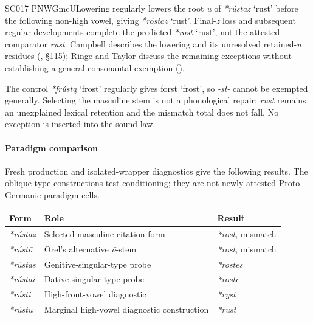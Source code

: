 \documentclass[
  british,
  a4paper,
]{article}
\newcounter{none} %
\providecommand{\Recon}[1]{\emph{*#1}}
\begin{document}
SC017 PNWGmcULowering regularly lowers the root \emph{u} of
\Recon{rústaz} `rust' before the following non-high vowel, giving
\Recon{róstaz} `rust'. Final-\emph{z} loss and subsequent regular
developments complete the predicted \Recon{rost} `rust', not the
attested comparator \emph{rust}. Campbell describes the lowering and its
unresolved retained-\emph{u} residues
(, §115); Ringe and Taylor
discuss the remaining exceptions without establishing a general
consonantal exemption ().

The control \Recon{frústą} `frost' regularly gives {forst} `frost', so
\emph{-st-} cannot be exempted generally. Selecting the masculine stem
is not a phonological repair: \emph{rust} remains an unexplained lexical
retention and the mismatch total does not fall. No exception is inserted
into the sound law.

\paragraph{Paradigm comparison}\label{paradigm-comparison-26}

Fresh production and isolated-wrapper diagnostics give the following
results. The oblique-type constructions test conditioning; they are not
newly attested Proto-Germanic paradigm cells.

{\def\LTcaptype{none} %
\begin{longtable}[]{@{}
  >{\raggedright\arraybackslash}p{}
  >{\raggedright\arraybackslash}p{}
  >{\raggedright\arraybackslash}p{}@{}}
\toprule\noalign{}
\begin{minipage}[b]{\linewidth}\raggedright
Form
\end{minipage} & \begin{minipage}[b]{\linewidth}\raggedright
Role
\end{minipage} & \begin{minipage}[b]{\linewidth}\raggedright
Result
\end{minipage} \\
\midrule\noalign{}
\endhead
\bottomrule\noalign{}
\endlastfoot
\Recon{rústaz} & Selected masculine citation form & \Recon{rost},
mismatch \\
\Recon{rústō} & Orel's alternative \emph{ō}-stem & \Recon{rost},
mismatch \\
\Recon{rústas} & Genitive-singular-type probe & \Recon{rostes} \\
\Recon{rústai} & Dative-singular-type probe & \Recon{roste} \\
\Recon{rústi} & High-front-vowel diagnostic & \Recon{ryst} \\
\Recon{rústu} & Marginal high-vowel diagnostic construction &
\Recon{rust} \\
\end{longtable}
}
\end{document}
